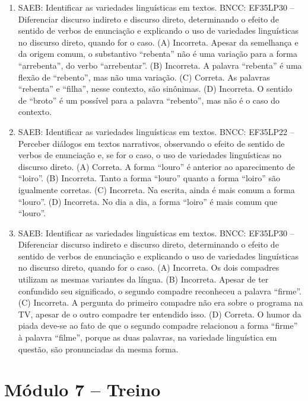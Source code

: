 \begin{enumerate}
\item
SAEB: Identificar as variedades linguísticas em textos.
BNCC: EF35LP30 -- Diferenciar discurso indireto e discurso direto,
determinando o efeito de sentido de verbos de enunciação e explicando o
uso de variedades linguísticas no discurso direto, quando for o caso.
(A) Incorreta. Apesar da semelhança e da origem comum, o substantivo ``rebenta'' não é uma variação para a forma ``arrebenta'', do verbo ``arrebentar''.
(B) Incorreta. A palavra ``rebenta'' é uma flexão de ``rebento'', mas não uma variação.
(C) Correta. As palavras ``rebenta'' e ``filha'', nesse contexto, são sinônimas.
(D) Incorreta. O sentido de ``broto'' é um possível para a palavra ``rebento'', mas não é o caso do contexto.

\item
SAEB: Identificar as variedades linguísticas em textos.
BNCC: EF35LP22 -- Perceber diálogos em textos narrativos, observando o
efeito de sentido de verbos de enunciação e, se for o caso, o uso de
variedades linguísticas no discurso direto.
(A) Correta. A forma ``louro'' é anterior ao aparecimento de ``loiro''.
(B) Incorreta. Tanto a forma ``louro'' quanto a forma ``loiro'' são igualmente corretas.
(C) Incorreta. Na escrita, ainda é mais comum a forma ``louro''.
(D) Incorreta. No dia a dia, a forma ``loiro'' é mais comum que ``louro''.

\item
SAEB: Identificar as variedades linguísticas em textos.
BNCC: EF35LP30 -- Diferenciar discurso indireto e discurso direto,
determinando o efeito de sentido de verbos de enunciação e explicando o
uso de variedades linguísticas no discurso direto, quando for o caso.
(A) Incorreta. Os dois compadres utilizam as mesmas variantes da língua.
(B) Incorreta. Apesar de ter confundido seu significado, o segundo compadre reconheceu a palavra ``firme''.
(C) Incorreta. A pergunta do primeiro compadre não era sobre o programa na TV, apesar de o outro compadre ter entendido isso.
(D) Correta. O humor da piada deve-se ao fato de que o segundo compadre relacionou a forma ``firme'' à palavra ``filme'', porque as duas palavras, na variedade linguística em questão, são pronunciadas da mesma forma.
\end{enumerate}

\section*{Módulo 7 – Treino}

